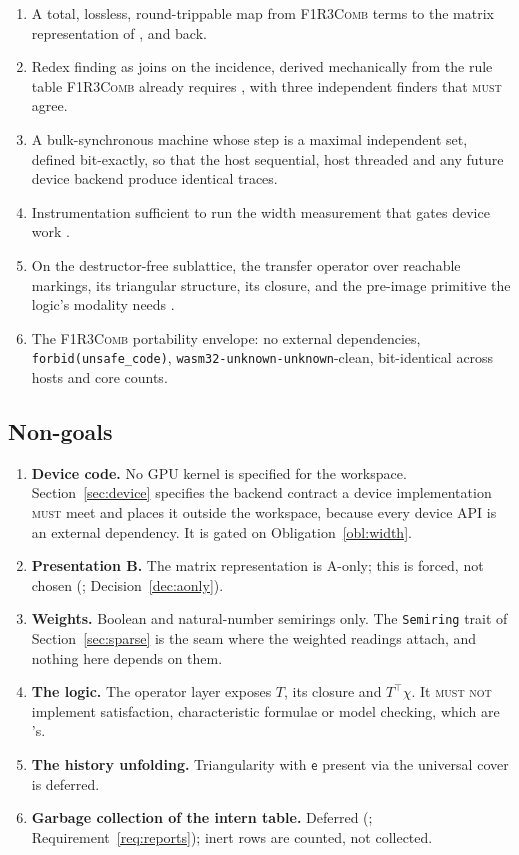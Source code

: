 \documentclass[11pt,a4paper]{article}
\newcommand{\code}[1]{\texttt{#1}}
\newcommand{\Comb}{\textsc{F1R3Comb}}
\newcommand{\MUST}{\textsc{must}}
\newcommand{\MUSTNOT}{\textsc{must not}}
\newcommand{\ev}{\mathsf{e}}
\theoremstyle{definition}
\theoremstyle{plain}
\begin{document}
\begin{enumerate}[leftmargin=1.6em]
\item A total, lossless, round-trippable map from \Comb{} terms to the matrix
representation of \cite[\S7]{matnote}, and back.
\item Redex finding as joins on the incidence, derived mechanically from the
rule table \Comb{} already requires \cite[Req.~4.7]{combspec}, with three
independent finders that \MUST{} agree.
\item A bulk-synchronous machine whose step is a maximal independent set,
defined bit-exactly, so that the host sequential, host threaded and any
future device backend produce identical traces.
\item Instrumentation sufficient to run the width measurement that gates
device work \cite[Obl.~13.7]{matnote}.
\item On the destructor-free sublattice, the transfer operator over reachable
markings, its triangular structure, its closure, and the pre-image primitive
the logic's modality needs \cite[Rem.~11.1]{matnote}.
\item The \Comb{} portability envelope: no external dependencies,
\code{forbid(unsafe\_code)}, \code{wasm32-unknown-unknown}-clean,
bit-identical across hosts and core counts.
\end{enumerate}

\subsection{Non-goals}\label{sec:nongoals}

\begin{enumerate}[leftmargin=1.6em]
\item \textbf{Device code.} No GPU kernel is specified for the workspace.
Section~\ref{sec:device} specifies the backend contract a device
implementation \MUST{} meet and places it outside the workspace, because
every device API is an external dependency. It is gated on
Obligation~\ref{obl:width}.
\item \textbf{Presentation B.} The matrix representation is A-only; this is
forced, not chosen (\cite[Rem.~3.1]{matnote}; Decision~\ref{dec:aonly}).
\item \textbf{Weights.} Boolean and natural-number semirings only. The
\code{Semiring} trait of Section~\ref{sec:sparse} is the seam where the
weighted readings attach, and nothing here depends on them.
\item \textbf{The logic.} The operator layer exposes $T$, its closure and
$T^{\top}\chi$. It \MUSTNOT{} implement satisfaction, characteristic formulae
or model checking, which are \cite{logic}'s.
\item \textbf{The history unfolding.} Triangularity with $\ev$ present via
the universal cover \cite[\S6.1, route (1)]{matnote} is deferred.
\item \textbf{Garbage collection of the intern table.} Deferred
(\cite[Obl.~13.3]{matnote}; Requirement~\ref{req:reports}); inert rows are counted, not collected.
\end{enumerate}
\end{document}
